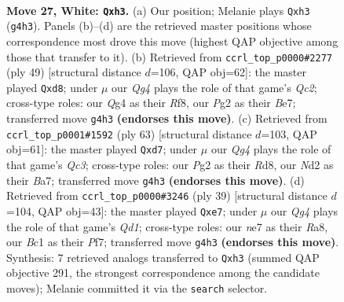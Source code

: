 \documentclass[11pt]{article}
\begin{document}
\clearpage

\begin{figure}[p]\centering
\begin{subfigure}{0.46\textwidth}\centering
\resizebox{\linewidth}{!}{%
\newchessgame
\chessboard[
  setfen={r3k3/b3n3/4p3/pp2q3/b1p3Q1/P6r/RP1NNPP1/2B1K3 w q - 0 27},
  showmover=false,
  pgfstyle=straightmove, color=movearrow, markmove={g4-h3}
]}
\caption{}
\end{subfigure}\hfill
\begin{subfigure}{0.46\textwidth}\centering
\resizebox{\linewidth}{!}{%
\newchessgame
\chessboard[
  setfen={3R1r1k/2q1b1pp/2b1Bn2/p1p5/N7/1PB4Q/P5PP/5R1K b - - 0 25},
  showmover=false,
  pgfstyle=straightmove, color=movearrow, markmove={c7-d8}
]}
\caption{}
\end{subfigure}
\\[4pt]
\begin{subfigure}{0.46\textwidth}\centering
\resizebox{\linewidth}{!}{%
\newchessgame
\chessboard[
  setfen={k2r4/bp1R4/p1q4p/1nP2p2/1PN2p2/P7/5Q1P/1K2RB2 b - - 0 32},
  showmover=false,
  pgfstyle=straightmove, color=movearrow, markmove={c6-d7}
]}
\caption{}
\end{subfigure}\hfill
\begin{subfigure}{0.46\textwidth}\centering
\resizebox{\linewidth}{!}{%
\newchessgame
\chessboard[
  setfen={r2q2k1/pp2Rp1p/2b3p1/5n2/6Q1/1PN5/P2P1BPP/5RK1 b - - 0 20},
  showmover=false,
  pgfstyle=straightmove, color=movearrow, markmove={d8-e7}
]}
\caption{}
\end{subfigure}
\caption{\textbf{Move 27, White: \texttt{Qxh3}.} (a) Our position; Melanie plays \texttt{Qxh3} (\texttt{g4h3}). Panels (b)--(d) are the retrieved master positions whose correspondence most drove this move (highest QAP objective among those that transfer to it). (b) Retrieved from \texttt{ccrl\_top\_p0000\#2277} (ply 49) [structural distance $d$=106, QAP obj=62]: the master played \texttt{Qxd8}; under $\mu$ our \emph{Qg4} plays the role of that game's \emph{Qc2}; cross-type roles: our \emph{Q}g4 as their \emph{R}f8, our \emph{P}g2 as their \emph{B}e7; transferred move \texttt{g4h3} \textbf{(endorses this move)}. (c) Retrieved from \texttt{ccrl\_top\_p0001\#1592} (ply 63) [structural distance $d$=103, QAP obj=61]: the master played \texttt{Qxd7}; under $\mu$ our \emph{Qg4} plays the role of that game's \emph{Qc3}; cross-type roles: our \emph{P}g2 as their \emph{R}d8, our \emph{N}d2 as their \emph{B}a7; transferred move \texttt{g4h3} \textbf{(endorses this move)}. (d) Retrieved from \texttt{ccrl\_top\_p0000\#3246} (ply 39) [structural distance $d$=104, QAP obj=43]: the master played \texttt{Qxe7}; under $\mu$ our \emph{Qg4} plays the role of that game's \emph{Qd1}; cross-type roles: our \emph{n}e7 as their \emph{R}a8, our \emph{B}c1 as their \emph{P}f7; transferred move \texttt{g4h3} \textbf{(endorses this move)}. Synthesis: 7 retrieved analogs transferred to \texttt{Qxh3} (summed QAP objective 291, the strongest correspondence among the candidate moves); Melanie committed it via the \texttt{search} selector.}
\label{fig:thought-m52}
\end{figure}
\end{document}
